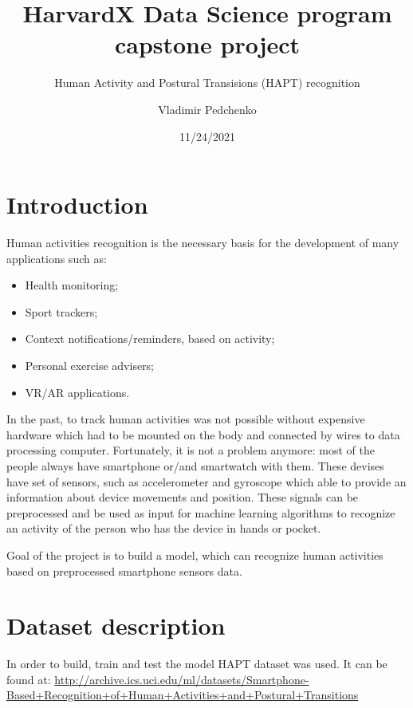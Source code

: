 \documentclass[
]{article}
\title{HarvardX Data Science program capstone project}
\subtitle{Human Activity and Postural Transisions (HAPT) recognition}
\author{Vladimir Pedchenko}
\date{11/24/2021}
\begin{document}
\maketitle

\newpage{}

{
\hypersetup{linkcolor=}
\setcounter{tocdepth}{2}
\tableofcontents
}
\hypertarget{introduction}{%
\section{Introduction}\label{introduction}}

Human activities recognition is the necessary basis for the development
of many applications such as:

\begin{itemize}
\item
  Health monitoring;
\item
  Sport trackers;
\item
  Context notifications/reminders, based on activity;
\item
  Personal exercise advisers;
\item
  VR/AR applications.
\end{itemize}

In the past, to track human activities was not possible without
expensive hardware which had to be mounted on the body and connected by
wires to data processing computer. Fortunately, it is not a problem
anymore: most of the people always have smartphone or/and smartwatch
with them. These devises have set of sensors, such as accelerometer and
gyroscope which able to provide an information about device movements
and position. These signals can be preprocessed and be used as input for
machine learning algorithms to recognize an activity of the person who
has the device in hands or pocket.

Goal of the project is to build a model, which can recognize human
activities based on preprocessed smartphone sensors data.

\hypertarget{dataset-description}{%
\section{Dataset description}\label{dataset-description}}

In order to build, train and test the model HAPT dataset was used. It
can be found at:
\url{http://archive.ics.uci.edu/ml/datasets/Smartphone-Based+Recognition+of+Human+Activities+and+Postural+Transitions}
\end{document}
